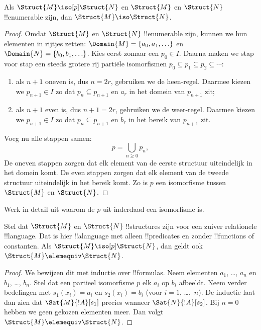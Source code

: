 \documentclass[openany]{memoir}
\begin{document}
\begin{thm}
  Als $\Struct{M} \iso[p] \Struct{N}$ en $\Struct{M}$ en
  $\Struct{N}$ !!{enumerable} zijn, dan $\Struct{M} \iso
  \Struct{N}$.
\end{thm}

\begin{proof}
  Omdat $\Struct{M}$ en $\Struct{N}$ !!{enumerable} zijn, kunnen we hun
  elementen in rijtjes zetten:
  $\Domain{M} = \{a_0, a_1, \ldots \}$ en
  $\Domain{N} = \{b_0, b_1, \ldots \}$. Kies eerst zomaar een
  $p_0 \in I$. Daarna maken we stap voor stap een steeds grotere rij
  partiële isomorfismen
  $p_0 \subseteq p_1 \subseteq p_2 \subseteq \cdots$:
  \begin{enumerate}
  \item als $n+1$ oneven is, dus $n = 2r$, gebruiken we de
    heen-regel. Daarmee kiezen we $p_{n+1} \in I$ zo dat
    $p_n \subseteq p_{n+1}$ en $a_r$ in het domein van $p_{n+1}$ zit;
  \item als $n+1$ even is, dus $n+1 =2r$, gebruiken we de
    weer-regel. Daarmee kiezen we $p_{n+1} \in I$ zo dat
    $p_n \subseteq p_{n+1}$ en $b_r$ in het bereik van $p_{n+1}$ zit.
  \end{enumerate}
Voeg nu alle stappen samen:
\[
p = \bigcup_{n\ge 0} p_n,
\]
De oneven stappen zorgen dat elk element van de eerste structuur uiteindelijk
in het domein komt. De even stappen zorgen dat elk element van de tweede
structuur uiteindelijk in het bereik komt. Zo is $p$ een
isomorfisme tussen $\Struct{M}$ en $\Struct{N}$.
\end{proof}

\begin{prob}
  Werk in detail uit waarom de $p$ uit
   inderdaad een isomorfisme is.
\end{prob}

\begin{thm}
  Stel dat $\Struct{M}$ en $\Struct{N}$ !!{structure}s zijn voor een
  zuiver relationele !!{language}. Dat is hier !!a{language} met
  alleen !!{predicate}s en zonder !!{function}s of constanten. Als
  $\Struct{M} \iso[p] \Struct{N}$, dan geldt ook
  $\Struct{M} \elemequiv \Struct{N}$.
\end{thm}

\begin{proof}
  We bewijzen dit met inductie over !!{formula}s. Neem elementen
  $a_1$, \dots, $a_n$ en $b_1$, \dots, $b_n$. Stel dat een partieel
  isomorfisme $p$ elk $a_i$ op $b_i$ afbeeldt. Neem verder bedelingen
  met $s_1(x_i) =a_i$ en $s_2(x_i) =b_i$ (voor
  $i =1$, \dots,~$n$). De inductie laat dan zien dat
  $\Sat{M}{!A}[s_1]$ precies wanneer $\Sat{N}{!A}[s_2]$. Bij $n=0$
  hebben we geen gekozen elementen meer. Dan volgt
  $\Struct{M} \elemequiv \Struct{N}$.
\end{proof}
\end{document}
